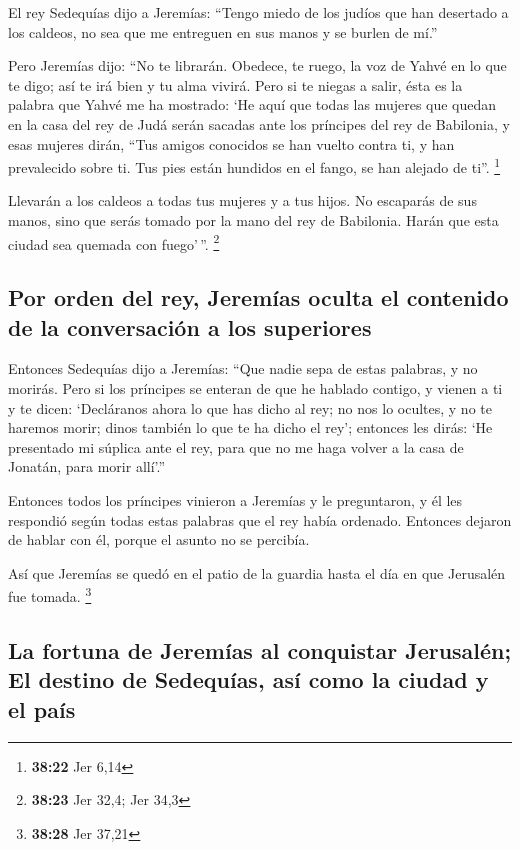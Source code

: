 El rey Sedequías dijo a Jeremías: ``Tengo miedo de los
judíos que han desertado a los caldeos, no sea que me entreguen en sus
manos y se burlen de mí.''

 Pero Jeremías dijo: ``No te librarán. Obedece, te ruego,
la voz de Yahvé en lo que te digo; así te irá bien y tu alma vivirá.
 Pero si te niegas a salir, ésta es la palabra que Yahvé
me ha mostrado:  `He aquí que todas las mujeres que
quedan en la casa del rey de Judá serán sacadas ante los príncipes del
rey de Babilonia, y esas mujeres dirán, ``Tus amigos conocidos se han
vuelto contra ti, y han prevalecido sobre ti. Tus pies están hundidos en
el fango, se han alejado de ti''. \footnote{\textbf{38:22} Jer 6,14}

 Llevarán a los caldeos a todas tus mujeres y a tus
hijos. No escaparás de sus manos, sino que serás tomado por la mano del
rey de Babilonia. Harán que esta ciudad sea quemada con fuego'\,''.
\footnote{\textbf{38:23} Jer 32,4; Jer 34,3}

\hypertarget{por-orden-del-rey-jeremuxedas-oculta-el-contenido-de-la-conversaciuxf3n-a-los-superiores}{%
\subsection{Por orden del rey, Jeremías oculta el contenido de la
conversación a los
superiores}\label{por-orden-del-rey-jeremuxedas-oculta-el-contenido-de-la-conversaciuxf3n-a-los-superiores}}

 Entonces Sedequías dijo a Jeremías: ``Que nadie sepa de
estas palabras, y no morirás.  Pero si los príncipes se
enteran de que he hablado contigo, y vienen a ti y te dicen: `Decláranos
ahora lo que has dicho al rey; no nos lo ocultes, y no te haremos morir;
dinos también lo que te ha dicho el rey';  entonces les
dirás: `He presentado mi súplica ante el rey, para que no me haga volver
a la casa de Jonatán, para morir allí'.''

 Entonces todos los príncipes vinieron a Jeremías y le
preguntaron, y él les respondió según todas estas palabras que el rey
había ordenado. Entonces dejaron de hablar con él, porque el asunto no
se percibía.

 Así que Jeremías se quedó en el patio de la guardia
hasta el día en que Jerusalén fue tomada. \footnote{\textbf{38:28} Jer
  37,21}

\hypertarget{la-fortuna-de-jeremuxedas-al-conquistar-jerusaluxe9n-el-destino-de-sedequuxedas-asuxed-como-la-ciudad-y-el-pauxeds}{%
\subsection{La fortuna de Jeremías al conquistar Jerusalén; El destino
de Sedequías, así como la ciudad y el
país}\label{la-fortuna-de-jeremuxedas-al-conquistar-jerusaluxe9n-el-destino-de-sedequuxedas-asuxed-como-la-ciudad-y-el-pauxeds}}

